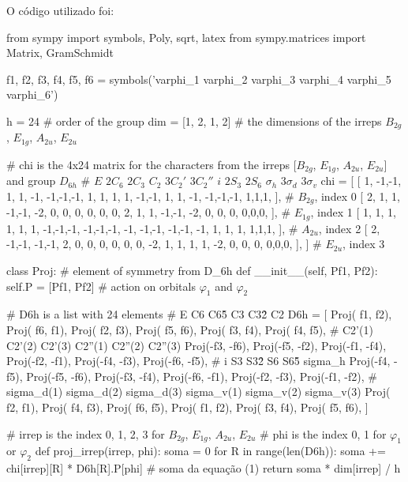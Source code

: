 \documentclass[a4paper,10pt]{article}
\begin{document}
\n

O código utilizado foi:

\begin{Python}
from sympy import symbols, Poly, sqrt, latex
from sympy.matrices import Matrix, GramSchmidt

f1, f2, f3, f4, f5, f6 = symbols('varphi_1 varphi_2 varphi_3 varphi_4 varphi_5 varphi_6')

h = 24  # order of the group
dim = [1, 2, 1, 2]  # the dimensions of the irreps $B_{2g}$, $E_{1g}$, $A_{2u}$, $E_{2u}$

# chi is the 4x24 matrix for the characters from the irreps [$B_{2g}$, $E_{1g}$, $A_{2u}$, $E_{2u}$] and group $D_{6h}$
#         $E$  $2 C_6$    $2 C_3$  $C_2$     $3 C_2'$      $3 C_2''$      $i$    $2 S_3$     $2 S_6$  $\sigma_h$    $3 \sigma_d$     $3 \sigma_v$
chi = [ [ 1, -1,-1,  1, 1, -1,  -1,-1,-1,  1, 1, 1,   1,  -1,-1,   1, 1, -1, -1,-1,-1, 1,1,1, ],     #  $B_{2g}$, index 0
        [ 2,  1, 1, -1,-1, -2,   0, 0, 0,  0, 0, 0,   2,   1, 1,  -1,-1, -2,  0, 0, 0, 0,0,0, ],     #  $E_{1g}$, index 1
        [ 1,  1, 1,  1, 1,  1,  -1,-1,-1, -1,-1,-1,  -1,  -1,-1,  -1,-1, -1,  1, 1, 1, 1,1,1, ],     #  $A_{2u}$, index 2
        [ 2, -1,-1, -1,-1,  2,   0, 0, 0,  0, 0, 0,  -2,   1, 1,   1, 1, -2,  0, 0, 0, 0,0,0, ], ]   #  $E_{2u}$, index 3

class Proj:     # element of symmetry from D\_6h
    def __init__(self, Pf1, Pf2):
        self.P = [Pf1, Pf2]     # action on orbitals $\varphi_1$ and $\varphi_2$

# D6h is a list with 24 elements
#              E               C6             C6\^5            C3            C3\^2             C2
D6h = [ Proj( f1,  f2), Proj( f6,  f1), Proj( f2,  f3), Proj( f5,  f6), Proj( f3,  f4), Proj( f4,  f5),
#            C2'(1)          C2'(2)         C2'(3)         C2''(1)        C2''(2)          C2''(3)
        Proj(-f3, -f6), Proj(-f5, -f2), Proj(-f1, -f4), Proj(-f2, -f1), Proj(-f4, -f3), Proj(-f6, -f5),
#              i              S3             S3\^2             S6           S6\^5            sigma\_h
        Proj(-f4, -f5), Proj(-f5, -f6), Proj(-f3, -f4), Proj(-f6, -f1), Proj(-f2, -f3), Proj(-f1, -f2),
#           sigma\_d(1)     sigma\_d(2)      sigma\_d(3)     sigma\_v(1)      sigma\_v(2)     sigma\_v(3)
        Proj( f2,  f1), Proj( f4,  f3), Proj( f6,  f5), Proj( f1,  f2), Proj( f3,  f4), Proj( f5,  f6),  ]

# irrep is the index 0, 1, 2, 3 for $B_{2g}$, $E_{1g}$, $A_{2u}$, $E_{2u}$
# phi is the index 0, 1 for $\varphi_1$ or $\varphi_2$
def proj_irrep(irrep, phi):
    soma = 0
    for R in range(len(D6h)):
        soma += chi[irrep][R] * D6h[R].P[phi]   # soma da equação (1)
    return soma * dim[irrep] / h


\end{Python}
\end{document}
